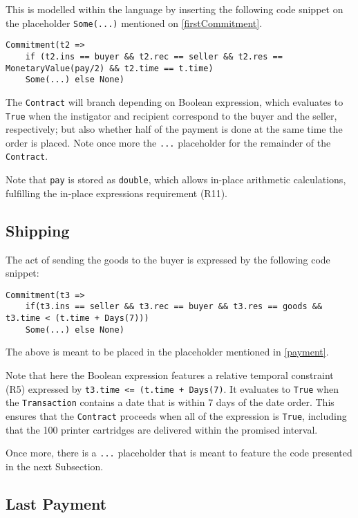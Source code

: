 \documentclass{ituthesis}
\begin{document}
This is modelled within the language by inserting the following code snippet on the placeholder \texttt{Some(...)} mentioned on \ref{firstCommitment}.
\begin{lstlisting}
Commitment(t2 =>
    if (t2.ins == buyer && t2.rec == seller && t2.res == MonetaryValue(pay/2) && t2.time == t.time)
    Some(...) else None)
\end{lstlisting}

The \texttt{Contract} will branch depending on Boolean expression, which evaluates to \texttt{True} when the instigator and recipient correspond to the buyer and the seller, respectively; but also whether half of the payment is done at the same time the order is placed. Note once more the \texttt{...} placeholder for the remainder of the \texttt{Contract}.

Note that \texttt{pay} is stored as \texttt{double}, which allows in-place arithmetic calculations, fulfilling the in-place expressions requirement (R11).

\subsection{Shipping} \label{shipping}

The act of sending the goods to the buyer is expressed by the following code snippet:
\begin{lstlisting}
Commitment(t3 =>
    if(t3.ins == seller && t3.rec == buyer && t3.res == goods && t3.time < (t.time + Days(7)))
	Some(...) else None)
\end{lstlisting}
The above is meant to be placed in the placeholder mentioned in \ref{payment}.

Note that here the Boolean expression features a relative temporal constraint (R5) expressed by \texttt{t3.time <= (t.time + Days(7)}. It evaluates to \texttt{True} when the \texttt{Transaction} contains a date that is within 7 days of the date order. This ensures that the \texttt{Contract} proceeds when all of the expression is \texttt{True}, including that the 100 printer cartridges are delivered within the promised interval.

Once more, there is a \texttt{...} placeholder that is meant to feature the code presented in the next Subsection.

\subsection{Last Payment} \label{lastPayment}
\end{document}
